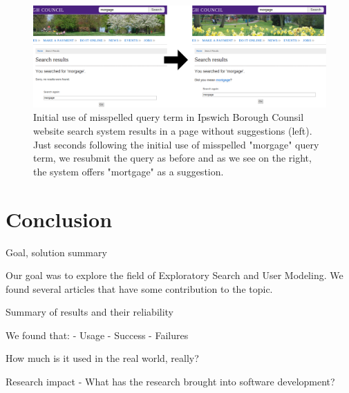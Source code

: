 \documentclass{sigchi}
\begin{document}
\begin{figure}[htp] %
\caption{Initial use of misspelled query term in Ipswich Borough Counsil website search system results in a page without suggestions (left).
Just seconds following the initial use of misspelled "morgage" query term, we resubmit the query as before and as we see on the right, the system offers "mortgage" as a suggestion.
\protect} \label{figure_queryExpansion3}
\centering
\includegraphics[scale=0.41]{figures/queryExpansion3.pdf} 
\end{figure}



\section{Conclusion}
Goal, solution summary

Our goal was to explore the field of Exploratory Search and User Modeling. We found several articles that have some contribution to the topic.

Summary of results and their reliability 

We found that:
- Usage
- Success
- Failures

How much is it used in the real world, really?

Research impact
- What has the research brought into software development?

\nocite{} %

%
%
%
%
%
\balance



\end{document}
